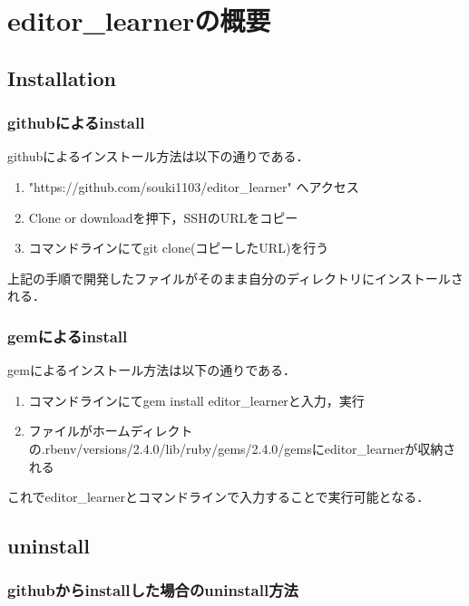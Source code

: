 \chapter{editor\_learnerの概要}

    \section{Installation}\label{installation}

\subsection{githubによるinstall}\label{githubux306bux3088ux308binstall}

githubによるインストール方法は以下の通りである．

\begin{enumerate}
\def\labelenumi{\arabic{enumi}.}
\tightlist
\item
  "https://github.com/souki1103/editor\_learner" へアクセス
\item
  Clone or downloadを押下，SSHのURLをコピー
\item
  コマンドラインにてgit clone(コピーしたURL)を行う
\end{enumerate}
上記の手順で開発したファイルがそのまま自分のディレクトリにインストールされる．

\subsection{gemによるinstall}\label{gemux306bux3088ux308binstall}

gemによるインストール方法は以下の通りである．

\begin{enumerate}
\def\labelenumi{\arabic{enumi}.}
\tightlist
\item
  コマンドラインにてgem install editor\_learnerと入力，実行
\item
  ファイルがホームディレクトの.rbenv/versions/2.4.0/lib/ruby/gems/2.4.0/gemsにeditor\_learnerが収納される
\end{enumerate}
これでeditor\_learnerとコマンドラインで入力することで実行可能となる．

    \section{uninstall}\label{uninstall}

\subsection{githubからinstallした場合のuninstall方法}\label{githubux304bux3089installux3057ux305fux5834ux5408ux306euninstallux65b9ux6cd5}

